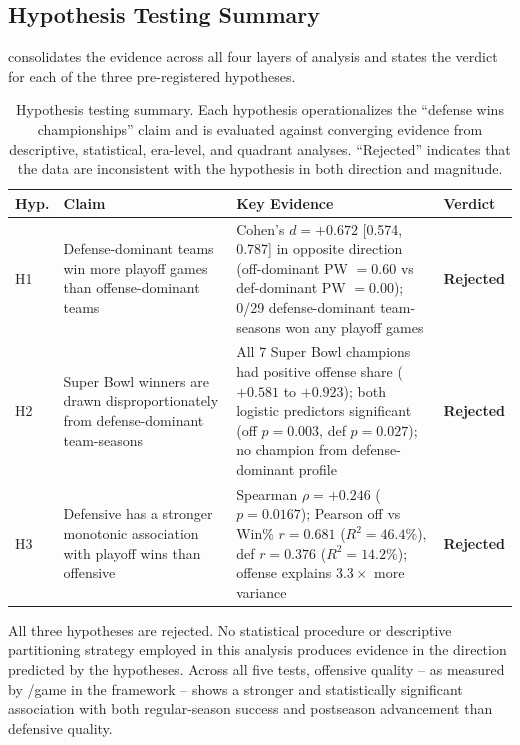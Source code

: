 \subsection{Hypothesis Testing Summary}
\label{sec:hypothesis-summary}

 consolidates the evidence across all four layers
of analysis and states the verdict for each of the three pre-registered
hypotheses.

\begin{table}[htbp]
  \centering
  \caption{Hypothesis testing summary. Each hypothesis operationalizes the
           ``defense wins championships'' claim and is evaluated against
           converging evidence from descriptive, statistical, era-level, and
           quadrant analyses. ``Rejected'' indicates that the data are
           inconsistent with the hypothesis in both direction and magnitude.}
  \label{tab:hypothesis-summary}
  \small
  \begin{tabularx}{\textwidth}{l p{3.2cm} X l}
    \toprule
    \textbf{Hyp.} & \textbf{Claim}
      & \textbf{Key Evidence} & \textbf{Verdict} \\
    \midrule
    H1 & Defense-dominant teams win more playoff games than offense-dominant teams
      & Cohen's $d = +0.672$ [0.574, 0.787] in opposite direction (off-dominant PW $= 0.60$ vs def-dominant PW $= 0.00$); 0/29 defense-dominant team-seasons won any playoff games
      & \textbf{Rejected} \\[8pt]
    H2 & Super Bowl winners are drawn disproportionately from defense-dominant team-seasons
      & All 7 Super Bowl champions had positive offense share ($+0.581$ to $+0.923$); both logistic predictors significant (off $p = 0.003$, def $p = 0.027$); no champion from defense-dominant profile
      & \textbf{Rejected} \\[8pt]
    H3 & Defensive \xvoa{} has a stronger monotonic association with playoff wins than offensive \xvoa{}
      & Spearman $\rho = +0.246$ ($p = 0.0167$); Pearson off vs Win\% $r = 0.681$ ($R^2 = 46.4\%$), def $r = 0.376$ ($R^2 = 14.2\%$); offense explains $3.3\times$ more variance
      & \textbf{Rejected} \\
    \bottomrule
  \end{tabularx}
\end{table}

All three hypotheses are rejected. No statistical procedure or descriptive
partitioning strategy employed in this analysis produces evidence in the
direction predicted by the hypotheses. Across all five tests, offensive
quality -- as measured by \xvoa{}/game in the \gds{} framework -- shows a
stronger and statistically significant association with both regular-season
success and postseason advancement than defensive quality.

